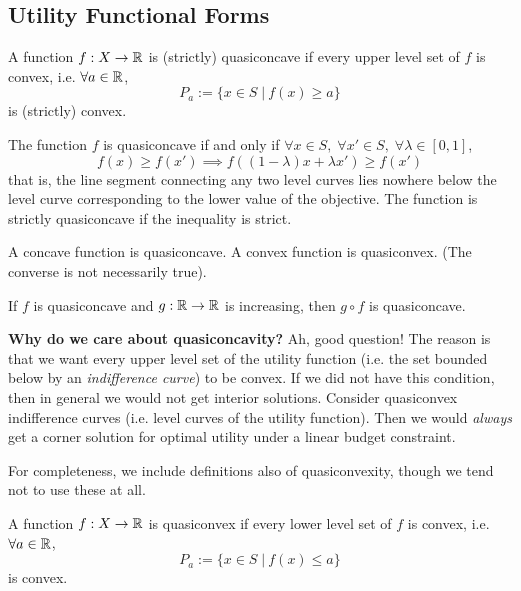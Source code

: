 

\subsection{Utility Functional Forms}
\label{sec:util-funct-forms}

\begin{definition}
  A function $f : X \to {\mathbb R}$ is (strictly) quasiconcave if every upper level set
  of $f$ is convex, i.e. $\forall a \in {\mathbb R}$,
  \[
  P_a := \{x \in S \; | \: f(x) \geq a\}
  \]
  is (strictly) convex.
\end{definition}

\begin{prop}
  The function $f$ is quasiconcave if and only if $\forall x \in S,\;
  \forall x' \in S, \; \forall \lambda \in [0,1]$,
  \[
  f(x) \geq f(x') \implies f((1-\lambda)x + \lambda x') \geq f(x')
  \]
  that is, the line segment connecting any two level curves lies
  nowhere below the level curve corresponding to the lower value of
  the objective. The function is strictly quasiconcave if the
  inequality is strict.
\end{prop}

\begin{prop}
  A concave function is quasiconcave. A convex function is
  quasiconvex. (The converse is not necessarily true).
\end{prop}

\begin{prop}
  If $f$ is quasiconcave and $g: {\mathbb R} \to {\mathbb R}$ is increasing, then $g
  \circ f$ is quasiconcave.
\end{prop}


\textbf{Why do we care about quasiconcavity?} Ah, good question! The
reason is that we want every upper level set of the utility function
(i.e. the set bounded below by an \textit{indifference curve}) to be
convex. If we did not have this condition, then in general we would
not get interior solutions. Consider quasiconvex indifference curves
(i.e. level curves of the utility function). Then we would
\textit{always} get a corner solution for optimal utility under a
linear budget constraint.


For completeness, we include definitions also of quasiconvexity,
though we tend not to use these at all.

\begin{definition}
  A function $f : X \to {\mathbb R}$ is quasiconvex if every lower level set
  of $f$ is convex, i.e. $\forall a \in {\mathbb R}$,
  \[
  P_a := \{x \in S \; | \: f(x) \leq a\}
  \]
  is convex.
\end{definition}

